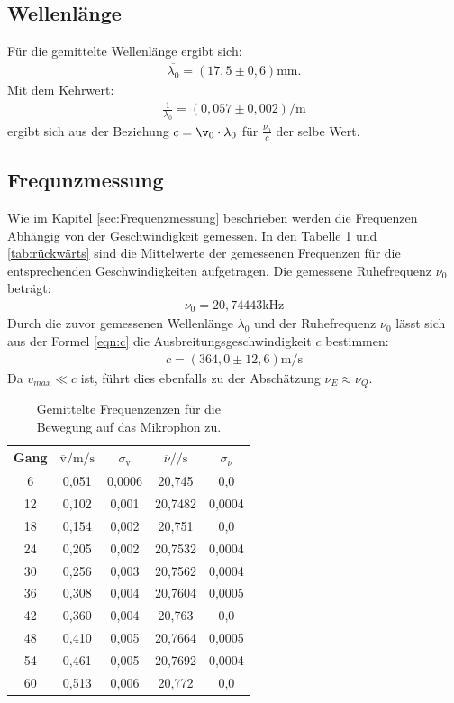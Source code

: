 \subsection{Wellenlänge }
Für die gemittelte Wellenlänge ergibt sich:
\begin{align}
  \overline{\lambda_0}=(17,5\pm 0,6) \si{\milli\meter}.
\end{align}
Mit dem Kehrwert:
\begin{align}
\frac{1}{\lambda_0}=(0,057\pm 0,002) \si{\per\meter}
\end{align}
ergibt sich aus der Beziehung $c=\v_0\cdot\lambda_0$ für $\frac{\nu_0}{c}$
der selbe Wert.

\subsection{Frequnzmessung}
Wie im Kapitel \ref{sec:Frequenzmessung} beschrieben werden die
Frequenzen Abhängig von der Geschwindigkeit gemessen.
In den Tabelle \ref{tab:vorwärts} und \ref{tab:rückwärts} sind
die Mittelwerte der gemessenen Frequenzen
für die entsprechenden Geschwindigkeiten aufgetragen.
Die gemessene Ruhefrequenz $\nu_0$ beträgt:
\begin{align}
  \nu_0=20,74443\text{kHz}
\end{align}
Durch die zuvor gemessenen Wellenlänge $\lambda_0$
und der Ruhefrequenz $\nu_0$ lässt sich aus der Formel \eqref{eqn:c}
die Ausbreitungsgeschwindigkeit $c$ bestimmen:
\begin{align}
  c=(364,0\pm12,6)\si{\meter\per\second}
\end{align}
Da $v_{max}\ll c$ ist, führt dies ebenfalls zu der Abschätzung
$\nu_E \approx \nu_Q $.
\begin{table}
  \centering
  \caption{Gemittelte Frequenzenzen für die Bewegung auf das Mikrophon zu.}
  \label{tab:vorwärts}
  \begin{tabular}{c c c c c}
    \toprule
Gang &  $ \overline{\text{v}} / \si{\meter\per\second}$ & $\sigma_{\text{v}}$
 & $\overline{\nu}/\si{\per\second}$ & $\sigma_{\nu}$\\
    \midrule
    6  & 0,051  & 0,0006 & 20,745  & 0,0\\
    12 & 0,102  & 0,001  & 20,7482 & 0,0004\\
    18 & 0,154  & 0,002  & 20,751  & 0,0\\
    24 & 0,205  & 0,002  & 20,7532 & 0,0004\\
    30 & 0,256  & 0,003  & 20,7562 & 0,0004\\
    36 & 0,308  & 0,004  & 20,7604 & 0,0005\\
    42 & 0,360  & 0,004  & 20,763  & 0,0\\
    48 & 0,410  & 0,005  & 20,7664 & 0,0005\\
    54 & 0,461  & 0,005  & 20,7692 & 0,0004\\
    60 & 0,513  & 0,006  & 20,772  & 0,0\\
    \bottomrule
  \end{tabular}
\end{table}
